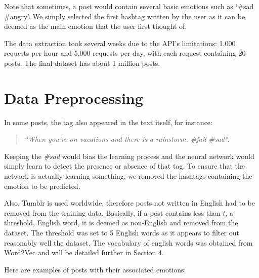 Note that sometimes, a post would contain several basic emotions such as `\#sad \#angry'. We simply selected the first hashtag written by the user as it can be deemed as the main emotion that the user first thought of.

The data extraction took several weeks due to the API's limitations: 1,000 requests per hour and 5,000 requests per day, with each request containing 20 posts. The final dataset has about 1 million posts.

\section{Data Preprocessing}
In some posts, the tag also appeared in the text itself, for instance:
\begin{quote}
\textit{``When you're on vacations and there is a rainstorm. \#fail \#sad"}.
\end{quote}
Keeping the \textit{\#sad} would bias the learning process and the neural network would simply learn to detect the presence or absence of that tag. To ensure that the network is actually learning something, we removed the hashtags containing the emotion to be predicted.

Also, Tumblr is used worldwide, therefore posts not written in English had to be removed from the training data. Basically, if a post contains less than $t$, a threshold, English word, it is deemed as non-English and removed from the dataset. The threshold was set to 5 English words as it appears to filter out reasonably well the dataset. The vocabulary of english words was obtained from Word2Vec and will be detailed further in Section 4.

Here are examples of posts with their associated emotions:

